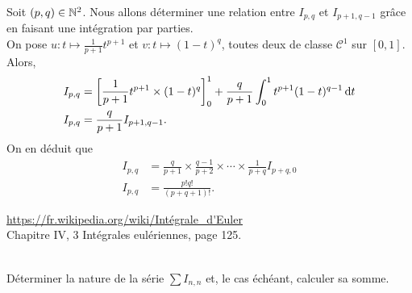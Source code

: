 \begin{preuve}
    Soit $(p,q) \in \mathbb{N}^2$. Nous allons déterminer une relation entre $I_{p,q}$ et $I_{p+1, q-1}$ grâce en faisant une intégration par parties. \\
    On pose $u:t\mapsto \frac{1}{p+1} t^{p+1}$ et $v:t\mapsto (1-t)^q$, toutes deux de classe $\mathscr{C}^1$ sur $[0, 1]$. Alors, 
    \begin{align*}
        I_{p,q} &= \left[ \frac{1}{p+1}t^{p+1} \times (1-t)^q \right]_0^1 + \frac{q}{p+1} \int_0^1 t^{p+1} (1-t)^{q-1} \, \mathrm{d} t \\
        I_{p,q} &= \frac{q}{p+1} I_{p+1, q-1}.
    \end{align*}
    On en déduit que 
    \begin{align*}
        I_{p,q} &= \frac{q}{p+1} \times \frac{q-1}{p+2} \times \cdots \times \frac{1}{p+q} I_{p+q,0} \\
        I_{p,q} &= \frac{p! q!}{(p + q + 1)!}.
    \end{align*}
\end{preuve}

\url{https://fr.wikipedia.org/wiki/Intégrale_d'Euler} \\
\cite{calcul_infinitesimal} Chapitre IV, 3 Intégrales eulériennes, page 125.

\begin{exercice}
    \cite{acamanes} \\
    Déterminer la nature de la série $\sum I_{n,n}$ et, le cas échéant, calculer sa somme. 
\end{exercice}

\begin{solution}
\end{solution}
